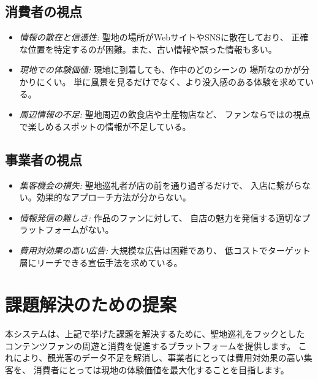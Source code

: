 \documentclass{docs}
\begin{document}
\subsection{消費者の視点}
\begin{itemize}
	\item \emph{情報の散在と信憑性:} 聖地の場所がWebサイトやSNSに散在しており、
	正確な位置を特定するのが困難。また、古い情報や誤った情報も多い。
	\item \emph{現地での体験価値:} 現地に到着しても、作中のどのシーンの
	場所なのかが分かりにくい。
	単に風景を見るだけでなく、より没入感のある体験を求めている。
	\item \emph{周辺情報の不足:} 聖地周辺の飲食店や土産物店など、
	ファンならではの視点で楽しめるスポットの情報が不足している。
\end{itemize}


\subsection{事業者の視点}
\begin{itemize}
	\item \emph{集客機会の損失:} 聖地巡礼者が店の前を通り過ぎるだけで、
	入店に繋がらない。効果的なアプローチ方法が分からない。
	\item \emph{情報発信の難しさ:} 作品のファンに対して、
	自店の魅力を発信する適切なプラットフォームがない。
	\item \emph{費用対効果の高い広告:} 大規模な広告は困難であり、
	低コストでターゲット層にリーチできる宣伝手法を求めている。
\end{itemize}

\section{課題解決のための提案}

本システムは、上記で挙げた課題を解決するために、聖地巡礼をフックとした
コンテンツファンの周遊と消費を促進するプラットフォームを提供します。
これにより、観光客のデータ不足を解消し、事業者にとっては費用対効果の高い集客を、
消費者にとっては現地の体験価値を最大化することを目指します。

\end{document}
